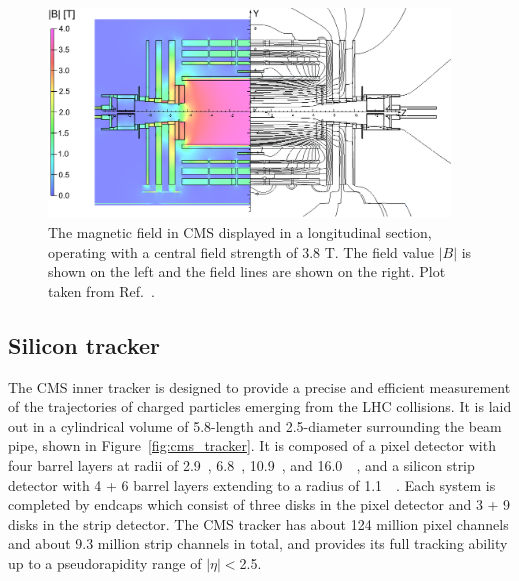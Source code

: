 \begin{figure}[!htb]
    \centering
    \captionsetup{justification=justified}
    \includegraphics[width=0.95\textwidth]{pics/LHC_CMS/CMS_field.png}
    \caption{The magnetic field in CMS displayed in a longitudinal section, operating with a central field strength of 3.8 T.
             The field value $|B|$ is shown on the left and the field lines are shown on the right.
             Plot taken from Ref.~\cite{Collaboration_2010}. }
    \label{fig:cms_field}
\end{figure}


\subsection{Silicon tracker}\label{sec:tracker}

The CMS inner tracker is designed to provide a precise and efficient measurement of the trajectories of charged particles emerging from the LHC collisions.
It is laid out in a cylindrical volume of 5.8-\meter length and 2.5-\meter diameter surrounding the beam pipe, shown in Figure~\ref{fig:cms_tracker}.
It is composed of a pixel detector with four barrel layers at radii of 2.9~\cm, 6.8~\cm, 10.9~\cm, and 16.0~\cm~\cite{phase1_tracker},
and a silicon strip detector with 4 + 6 barrel layers extending to a radius of 1.1~\meter~\cite{Collaboration_2008}.
Each system is completed by endcaps which consist of three disks in the pixel detector and 3 + 9 disks in the strip detector.
The CMS tracker has about 124 million pixel channels and about 9.3 million strip channels in total,
and provides its full tracking ability up to a pseudorapidity range of $|\eta| < $2.5.

